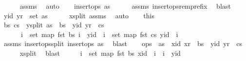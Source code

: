 \begin{isabellebody}
\ \ \ \ \isamarkupfalse%
\ assms{\isacharparenleft}{}{\isacharparenright}\ \isamarkupfalse%
\ auto\isanewline
\ \ \isamarkupfalse%
\ {\isachardoublequoteopen}insert{\isacharunderscore}ops\ as{}{\isachardoublequoteclose}\isanewline
\ \ \ \ \isamarkupfalse%
\ assms{\isacharparenleft}{}{\isacharparenright}\ insert{\isacharunderscore}ops{\isacharunderscore}rem{\isacharunderscore}prefix\ \isamarkupfalse%
\ blast\isanewline
\ \ \isamarkupfalse%
\ {\isachardoublequoteopen}{\isacharparenleft}yid{\isacharcomma}\ yr{\isacharparenright}\ {\isasymin}\ set\ as{}{\isachardoublequoteclose}\isanewline
\ \ \ \ \isamarkupfalse%
\ x{\isacharunderscore}split\ assms\ \isamarkupfalse%
\ auto\isanewline
\ \ \isamarkupfalse%
\ this\ \isamarkupfalse%
\ bs\ cs\ \ y{\isacharunderscore}split{\isacharcolon}\ {\isachardoublequoteopen}as{}\ {\isacharequal}\ bs\ {\isacharat}\ {\isacharbrackleft}{\isacharparenleft}yid{\isacharcomma}\ yr{\isacharparenright}{\isacharbrackright}\ {\isacharat}\ cs\ {\isasymand}\isanewline
\ \ \ \ \ \ {\isacharparenleft}{\isasymforall}i\ {\isasymin}\ set\ {\isacharparenleft}map\ fst\ bs{\isacharparenright}{\isachardot}\ i\ {\isacharless}\ yid{\isacharparenright}\ {\isasymand}\ {\isacharparenleft}{\isasymforall}i\ {\isasymin}\ set\ {\isacharparenleft}map\ fst\ cs{\isacharparenright}{\isachardot}\ yid\ {\isacharless}\ i{\isacharparenright}{\isachardoublequoteclose}\isanewline
\ \ \ \ \isamarkupfalse%
\ assms\ insert{\isacharunderscore}ops{\isacharunderscore}split\ {\isacartoucheopen}insert{\isacharunderscore}ops\ as{}{\isacartoucheclose}\ \isamarkupfalse%
\ blast\isanewline
\ \ \isamarkupfalse%
\ {\isachardoublequoteopen}ops\ {\isacharequal}\ as\ {\isacharat}\ {\isacharbrackleft}{\isacharparenleft}xid{\isacharcomma}\ xr{\isacharparenright}{\isacharbrackright}\ {\isacharat}\ bs\ {\isacharat}\ {\isacharbrackleft}{\isacharparenleft}yid{\isacharcomma}\ yr{\isacharparenright}{\isacharbrackright}\ {\isacharat}\ cs{\isachardoublequoteclose}\isanewline
\ \ \ \ \isamarkupfalse%
\ x{\isacharunderscore}split\ \isamarkupfalse%
\ blast\isanewline
\ \ \isamarkupfalse%
\ \isamarkupfalse%
\ {\isachardoublequoteopen}{\isasymforall}i\ {\isasymin}\ set\ {\isacharparenleft}map\ fst\ bs{\isacharparenright}{\isachardot}\ xid\ {\isacharless}\ i\ {\isasymand}\ i\ {\isacharless}\ yid{\isachardoublequoteclose}\isanewline

\end{isabellebody}
